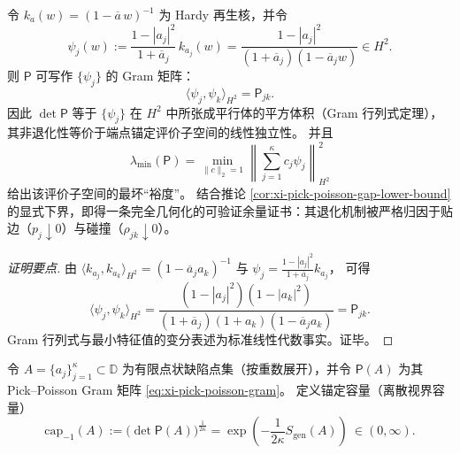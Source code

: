 



\begin{proposition}\label{prop:xi-pick-poisson-interpolation-margin-certificate}
令 \(k_a(w)=(1-\overline a\,w)^{-1}\) 为 Hardy 再生核，并令
\[
\psi_j(w):=\frac{1-|a_j|^2}{1+\overline a_j}\,k_{a_j}(w)
=\frac{1-|a_j|^2}{(1+\overline a_j)(1-\overline a_j w)}\in H^2.
\]
则 \(\mathsf P\) 可写作 \(\{\psi_j\}\) 的 Gram 矩阵：
\[
\boxed{\;
\langle \psi_j,\psi_k\rangle_{H^2}=\mathsf P_{jk}.\;}
\]
因此 \(\det\mathsf P\) 等于 \(\{\psi_j\}\) 在 \(H^2\) 中所张成平行体的平方体积（Gram 行列式定理），其非退化性等价于端点锚定评价子空间的线性独立性。
并且
\[
\lambda_{\min}(\mathsf P)
=\min_{\|c\|_2=1}\left\|\sum_{j=1}^{\kappa}c_j\psi_j\right\|_{H^2}^2
\]
给出该评价子空间的最坏“裕度”。
结合推论 \ref{cor:xi-pick-poisson-gap-lower-bound} 的显式下界，即得一条完全几何化的可验证余量证书：其退化机制被严格归因于贴边（\(p_j\downarrow 0\)）与碰撞（\(\rho_{jk}\downarrow 0\)）。
\end{proposition}
\begin{proof}[证明要点]
由 \(\langle k_{a_j},k_{a_k}\rangle_{H^2}=(1-\overline a_j a_k)^{-1}\) 与
\(
\psi_j=\frac{1-|a_j|^2}{1+\overline a_j}k_{a_j}
\)，
可得
\[
\langle \psi_j,\psi_k\rangle_{H^2}
=\frac{(1-|a_j|^2)(1-|a_k|^2)}{(1+\overline a_j)(1+a_k)(1-\overline a_j a_k)}
=\mathsf P_{jk}.
\]
Gram 行列式与最小特征值的变分表述为标准线性代数事实。证毕。
\end{proof}

\begin{definition}\label{def:xi-anchored-capacity-capminus1}
令 \(A=\{a_j\}_{j=1}^{\kappa}\subset\mathbb{D}\) 为有限点状缺陷点集（按重数展开），并令 \(\mathsf P(A)\) 为其 Pick--Poisson Gram 矩阵 \eqref{eq:xi-pick-poisson-gram}。
定义锚定容量（离散视界容量）
\[
\boxed{\;
\mathrm{cap}_{-1}(A):=\bigl(\det\mathsf P(A)\bigr)^{\frac{1}{2\kappa}}
=\exp\!\left(-\frac{1}{2\kappa}S_{\mathrm{gen}}(A)\right)\ \in(0,\infty).\;}
\]
\end{definition}

